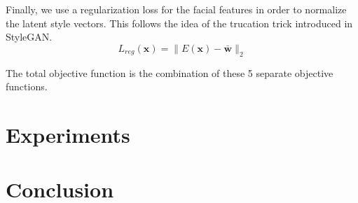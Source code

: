\documentclass[sigconf]{acmart}
\begin{document}
Finally, we use a regularization loss for the facial features in order to normalize
the latent style vectors. This follows the idea of the trucation trick introduced in
StyleGAN.
\[
    L_{reg}(\mathbf{x}) = \|E(\mathbf{x}) - \bar{\mathbf{w}}\|_2
\]

The total objective function is the combination of these 5 separate objective functions.

\section{Experiments}

\section{Conclusion}









\end{document}
